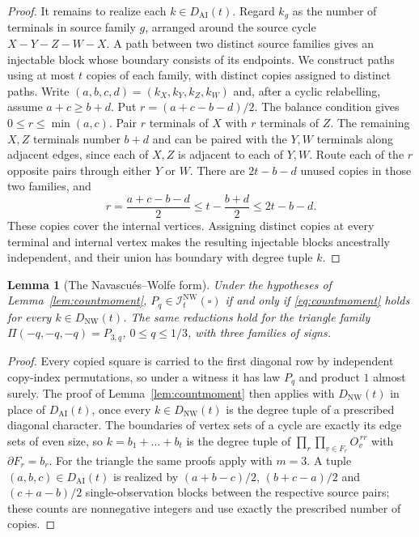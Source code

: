\documentclass[11pt]{article}
\theoremstyle{plain}
\newtheorem{lemma}[theorem]{Lemma}
\theoremstyle{definition}
\newcommand{\INW}{\mathcal I^{\mathrm{NW}}}
\begin{document}
\begin{proof}
It remains to realize each $k\in D_{\mathrm{AI}}(t)$. Regard $k_g$ as the number of terminals in source family $g$, arranged around the source cycle $X-Y-Z-W-X$. A path between two distinct source families gives an injectable block whose boundary consists of its endpoints. We construct paths using at most $t$ copies of each family, with distinct copies assigned to distinct paths. Write $(a,b,c,d)=(k_X,k_Y,k_Z,k_W)$ and, after a cyclic relabelling, assume $a+c\ge b+d$. Put $r=(a+c-b-d)/2$. The balance condition gives $0\le r\le\min(a,c)$. Pair $r$ terminals of $X$ with $r$ terminals of $Z$. The remaining $X,Z$ terminals number $b+d$ and can be paired with the $Y,W$ terminals along adjacent edges, since each of $X,Z$ is adjacent to each of $Y,W$. Route each of the $r$ opposite pairs through either $Y$ or $W$. There are $2t-b-d$ unused copies in those two families, and
\[
r=\frac{a+c-b-d}{2}\le t-\frac{b+d}{2}\le2t-b-d.
\]
These copies cover the internal vertices. Assigning distinct copies at every terminal and internal vertex makes the resulting injectable blocks ancestrally independent, and their union has boundary with degree tuple $k$.
\end{proof}

\begin{lemma}[The Navascu\'es--Wolfe form]\label{lem:countmomentNW}
Under the hypotheses of Lemma~\ref{lem:countmoment}, $P_q\in\INW_t(\square)$ if and only if \eqref{eq:countmoment} holds for every $k\in D_{\mathrm{NW}}(t)$. The same reductions hold for the triangle family $\Pi(-q,-q,-q)=P_{3,q}$, $0\le q\le1/3$, with three families of signs.
\end{lemma}

\begin{proof}
Every copied square is carried to the first diagonal row by independent copy-index permutations, so under a witness it has law $P_q$ and product $1$ almost surely. The proof of Lemma~\ref{lem:countmoment} then applies with $D_{\mathrm{NW}}(t)$ in place of $D_{\mathrm{AI}}(t)$, once every $k\in D_{\mathrm{NW}}(t)$ is the degree tuple of a prescribed diagonal character. The boundaries of vertex sets of a cycle are exactly its edge sets of even size, so $k=b_1+\dots+b_t$ is the degree tuple of $\prod_r\prod_{v\in F_r}O_v^{\,rr}$ with $\partial F_r=b_r$. For the triangle the same proofs apply with $m=3$. A tuple $(a,b,c)\in D_{\mathrm{AI}}(t)$ is realized by $(a+b-c)/2$, $(b+c-a)/2$ and $(c+a-b)/2$ single-observation blocks between the respective source pairs; these counts are nonnegative integers and use exactly the prescribed number of copies.
\end{proof}
\end{document}
